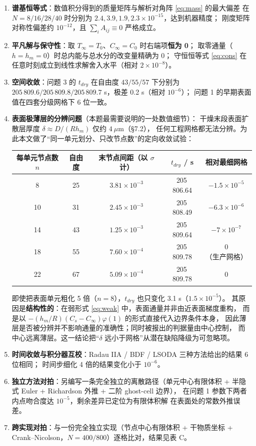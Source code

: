 \documentclass[12pt,a4paper]{ctexart}
\begin{document}
\begin{enumerate}[label=\arabic*),leftmargin=1.8em,itemsep=1pt]
  \item \textbf{谱基恒等式}：数值积分得到的质量矩阵与解析对角阵 \eqref{eq:mass} 的最大偏差
        在 $N=8/16/28/40$ 时分别为 $2.4,3.9,1.9,2.3\times10^{-15}$，达到机器精度；
        刚度矩阵对称性偏差约 $10^{-12}$，且 $\sum_iA_{ij}\equiv0$ 严格成立。
  \item \textbf{平凡解与保守性}：取 $T_\infty=T_0$、$C_\infty=C_0$ 时右端项\textbf{恒为 0}；
        取零通量（$h=h_m=0$）时总内能与总水分的改变量精确为 0；
        守恒恒等式 \eqref{eq:cons} 在任意时刻成立到线性求解舍入水平（相对 $2\times10^{-8}$）。
  \item \textbf{空间收敛}：问题 3 的 $t_{dry}$ 在自由度 $43/55/57$ 下分别为
        $205\,809.6/205\,809.8/205\,809.7$ s，极差 0.2 s（相对 $10^{-6}$）；
        问题 1 的早期表面值在四套分级网格下 6 位一致。
  \item \textbf{表面极薄层的分辨问题}（本题最需要说明的一处数值细节）：
        干燥末段表面扩散层厚度 $\delta\approx D/(Rh_m)$ 仅约 $4\ \mu$m（\S7.2），
        任何工程网格都无法分辨。为此本文做了“同一单元划分、只改节点数”的定向收敛试验：

\begin{center}
\small
\begin{tabular}{@{}ccccc@{}}
\toprule
每单元节点数 $n$ & 自由度 & 末节点间距（以 $\sigma$ 计） & $t_{dry}$ / s & 相对最细网格 \\
\midrule
8  & 25 & $3.81\times10^{-3}$ & 205\,806.64 & $-1.5\times10^{-5}$ \\
10 & 31 & $2.45\times10^{-3}$ & 205\,808.49 & $-6.3\times10^{-6}$ \\
14 & 43 & $1.25\times10^{-3}$ & 205\,809.64 & $-7\times10^{-7}$ \\
18 & 55 & $7.60\times10^{-4}$ & 205\,809.78 & $0$（生产网格） \\
22 & 67 & $5.09\times10^{-4}$ & 205\,809.78 & $0$ \\
\bottomrule
\end{tabular}
\end{center}

\noindent 即使把表面单元粗化 5 倍（$n=8$），$t_{dry}$ 也只变化 3.1 s（$1.5\times10^{-5}$）。
其原因是\textbf{结构性的}：在弱形式 \eqref{eq:weak} 中，表面通量并非由近表面梯度重构，
而是以 $-(h_m/R)(C_s-C_\infty)\varphi(1)$ 的形式直接代入边界条件本身，
因此薄层是否被分辨并不影响通量的准确性；同时被报出的判据量由中心控制，
而中心远离薄层。这一结论把“$\delta$ 远小于网格”从潜在缺陷降级为可忽略项。
  \item \textbf{时间收敛与积分器互校}：Radau IIA / BDF / LSODA 三种方法给出的结果 6 位相同；
        时间步细化 4 倍的结果变化小于 $10^{-6}$。
  \item \textbf{独立方法对拍}：另编写一条完全独立的离散路径（单元中心有限体积 +
        半隐式 Euler + Richardson 外推 + 二阶 ghost-cell 边界），
        在问题 1 参数下两者内点吻合度达 $10^{-5}$，剩余差异已定位为有限体积解
        在表面处的常数外推误差。
  \item \textbf{跨实现对拍}：与一份完全独立实现（节点中心有限体积 + 干物质坐标 +
        Crank--Nicolson，$N=400/800$）逐格比对，结果见表 C。


\end{enumerate}
\end{document}

